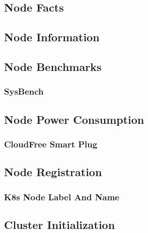 \subsection{Node Facts}
\label{subsec:implementation_installer_node_facts}

\subsection{Node Information}
\label{subsec:implementation_installer_node_information}

\subsection{Node Benchmarks}
\label{subsec:implementation_installer_node_benchmarks}

\subsubsection{SysBench}
\label{subsubsec:implementation_installer_node_benchmarks_sysbench}

\subsection{Node Power Consumption}
\label{subsec:implementation_installer_node_power_consumption}

\subsubsection{CloudFree Smart Plug}
\label{subsubsec:implementation_installer_node_power_consumption_cloudfree_smart_plug}

\subsection{Node Registration}
\label{subsec:implementation_installer_node_registration}

\subsubsection{K8s Node Label And Name}
\label{subsubsec:implementation_installer_node_registration_k8s_node_label_and_name}

\subsection{Cluster Initialization}
\label{subsec:implementation_installer_cluster_initialization}


